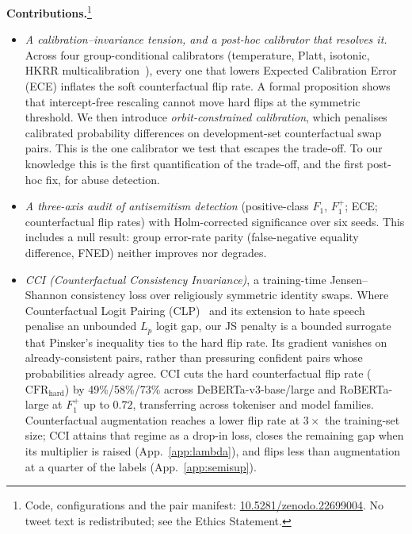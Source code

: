 \documentclass[11pt]{article}
\newcommand{\Fpos}{\ensuremath{F_1^{+}}\xspace}
\newcommand{\CFRh}{\ensuremath{\mathrm{CFR}_{\mathrm{hard}}}\xspace}
\begin{document}
\textbf{Contributions.}\footnote{Code, configurations and the pair manifest: \href{https://doi.org/10.5281/zenodo.22699004}{10.5281/zenodo.22699004}. No tweet text is redistributed; see the Ethics Statement.}
\begin{itemize}[leftmargin=1.2em,itemsep=2pt,topsep=2pt]
\item \emph{A calibration--invariance tension, and a post-hoc calibrator that resolves it.} Across four group-conditional calibrators (temperature, Platt, isotonic, HKRR multicalibration~\citep{hebertjohnson2018multicalibration}), every one that lowers Expected Calibration Error (ECE) inflates the soft counterfactual flip rate. A formal proposition shows that intercept-free rescaling cannot move hard flips at the symmetric threshold. We then introduce \emph{orbit-constrained calibration}, which penalises calibrated probability differences on development-set counterfactual swap pairs. This is the one calibrator we test that escapes the trade-off. To our knowledge this is the first quantification of the trade-off, and the first post-hoc fix, for abuse detection. \item \emph{A three-axis audit of antisemitism detection} (positive-class $F_1$, \Fpos; ECE; counterfactual flip rates) with Holm-corrected significance over six seeds. This includes a null result: group error-rate parity (false-negative equality difference, FNED) neither improves nor degrades. \item \emph{CCI (Counterfactual Consistency Invariance)}, a training-time Jensen--Shannon consistency loss over religiously symmetric identity swaps. Where Counterfactual Logit Pairing (CLP)~\citep{garg2019counterfactual} and its extension to hate speech~\citep{davani2021improving} penalise an unbounded $L_p$ logit gap, our JS penalty is a bounded surrogate that Pinsker's inequality ties to the hard flip rate. Its gradient vanishes on already-consistent pairs, rather than pressuring confident pairs whose probabilities already agree. CCI cuts the hard counterfactual flip rate (\CFRh) by 49\%/58\%/73\% across DeBERTa-v3-base/large and RoBERTa-large at \Fpos{} up to $0.72$, transferring across tokeniser and model families. Counterfactual augmentation reaches a lower flip rate at $3\times$ the training-set size; CCI attains that regime as a drop-in loss, closes the remaining gap when its multiplier is raised (App.~\ref{app:lambda}), and flips less than augmentation at a quarter of the labels (App.~\ref{app:semisup}).
\end{itemize}
\end{document}
